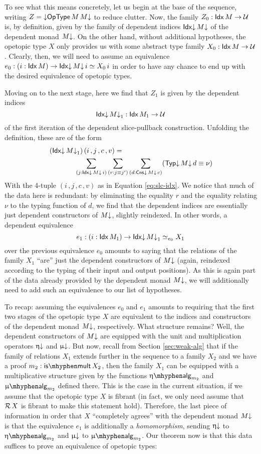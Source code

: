 To see what this means concretely, let us begin at the base of the
sequence, writing $Z = {\downarrow}\mathsf{OpType}\, M\, M{\downarrow}$ to reduce clutter.  Now,
the family $Z_0 : \mathsf{Idx}\, M \to \mathcal{U}$ is, by definition, given by the
family of dependent indices $\mathsf{Idx}{\downarrow}\, M{\downarrow}$ of the dependent monad
$M{\downarrow}$.  On the other hand, without additional hypotheses, the
opetopic type $X$ only provides us with some abstract type family
$X_0 : \mathsf{Idx}\, M \to \mathcal{U}$.  Clearly, then, we will need to assume an
equivalence $e_0 : (i : \mathsf{Idx}\, M) \to \mathsf{Idx}{\downarrow}\, M{\downarrow}\, i \simeq X_0\, i$ in
order to have any chance to end up with the desired equivalence of
opetopic types.

Moving on to the next stage, here we find that $Z_1$ is given
by the dependent indices
\[ \mathsf{Idx}{\downarrow}\, M{\downarrow}_1 : \mathsf{Idx}\, M_1 \to \mathcal{U} \] of the first iteration of the
dependent slice-pullback construction.  Unfolding the definition,
these are of the form
\begin{align*}
  (\Idxd M\da_1)\, (i \,, j \,, c \,, v)
  &= \\
  & \hspace{-2cm} \sum_{(j : \Idxd M\da\, i)} \sum_{(r : j \equiv j')} 
    \sum_{(d : \Cnsd M\da\, c)} (\Typd M\da\, d \equiv \nu)
\end{align*}
With the 4-tuple $(i \,, j \,, c \,, v)$ as in Equation
\ref{eq:slc-idx}.  We notice that much of the data here is redundant:
by eliminating the equality $r$ and the equality relating $\nu$ to the
typing function of $d$, we find that the dependent indices are
essentially just dependent constructors of $M{\downarrow}$, slightly reindexed.
In other words, a dependent equivalence
\[ e_1 : (i : \mathsf{Idx}\, M_1) \to \mathsf{Idx}{\downarrow}\, M{\downarrow}_1 \simeq_{e_0} X_1 \] over the
previous equivalence $e_0$ amounts to saying that the relations of the
family $X_1$ ``are'' just the dependent constructors of $M{\downarrow}$ (again,
reindexed according to the typing of their input and output
positions).  As this is again part of the data already provided by the
dependent monad $M{\downarrow}$, we will additionally need to add such an
equivalence to our list of hypotheses.

To recap: assuming the equivalences $e_0$ and $e_1$ amounts to
requiring that the first two stages of the opetopic type $X$ are
equivalent to the indices and constructors of the dependent monad
$M{\downarrow}$, respectively.  What structure remains? Well, the dependent
constructors of $M{\downarrow}$ are equipped with the unit and multiplication
operators $\upeta{\downarrow}$ and $\upmu{\downarrow}$.  But now, recall from Section
\ref{sec:weak-alg} that if the family of relations $X_1$ extends
further in the sequence to a family $X_2$ and we have a proof
$m_2 : \ismult X_2$, then the family $X_1$ can be equipped with a
multiplicative structure given by the functions $\upeta\alg_{m_2}$ and
$\upmu\alg_{m_2}$ defined there.  This is the case in the current
situation, if we assume that the opetopic type $X$ is fibrant (in
fact, we only need assume that $\mathcal{R}\, X$ is fibrant to make this
statement hold).  Therefore, the last piece of information in order
that $X$ ``completely agrees'' with the dependent monad $M{\downarrow}$ is that
the equivalence $e_1$ is additionally a \emph{homomorphism}, sending
$\upeta{\downarrow}$ to $\upeta\alg_{m_2}$ and $\upmu{\downarrow}$ to $\upmu\alg_{m_2}$. Our
theorem now is that this data suffices to prove an equivalence of
opetopic types:

